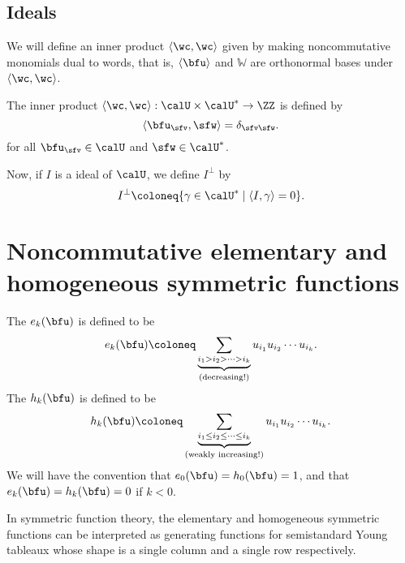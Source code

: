 \documentclass{article}
\newcommand{\ip}[1]{
    \left\langle
        {#1}
    \right\rangle
}
\newcommand*\WW{\mathbb{W}}
\begin{document}
\subsection{Ideals}

We will define an inner product $\ip{\wc,\wc}$ given by making noncommutative monomials dual to words, that is, $\langle \bfu \rangle$ and $\WW$ are orthonormal bases under $\ip{\wc,\wc}$.

\begin{definition}
    The inner product $\ip{\wc,\wc}: \calU \times \calU^\ast \to \ZZ$ is defined by
    \[
        \ip{\bfu_\sfv, \sfw} 
        = 
        \delta_{\sfv\sfw}.
    \]
    for all $\bfu_\sfv \in \calU$ and $\sfw \in \calU^\ast$.
\end{definition}

Now, if $I$ is a ideal of $\calU$, we define $I^\perp$ by
\[
    I^\perp
    \coloneq
    \{
        \gamma \in \calU^\ast
        \mid
        \ip{I, \gamma} = 0
    \}.
\]



\section{
    Noncommutative elementary and homogeneous symmetric functions
}

\begin{definition}
    The  $e_k(\bfu)$ is defined to be
    \begin{equation}
        \label{eqn:ncElementaryDef}
        e_k(\bfu)
        \coloneq
        \underbrace{
            \sum_{i_1 > i_2 > \cdots > i_k}
        }_{\text{(decreasing!)}}
        u_{i_1} u_{i_2} \cdots u_{i_k}. 
    \end{equation}
    The  $h_k(\bfu)$ is defined to be
    \begin{equation}
        \label{eqn:ncHomogeneousDef}
        h_k(\bfu)
        \coloneq
        \underbrace{
            \sum_{i_1 \leq i_2 \leq \cdots \leq i_k}
        }_{\text{(weakly increasing!)}}
        u_{i_1} u_{i_2} \cdots u_{i_k}. 
    \end{equation}
    We will have the convention that $e_0(\bfu) = h_0(\bfu) = 1$, and that $e_k(\bfu) = h_k(\bfu) = 0$ if $k < 0$.
\end{definition}

In symmetric function theory, the elementary and homogeneous symmetric functions can be interpreted as generating functions for semistandard Young tableaux whose shape is a single column and a single row respectively.
\end{document}
